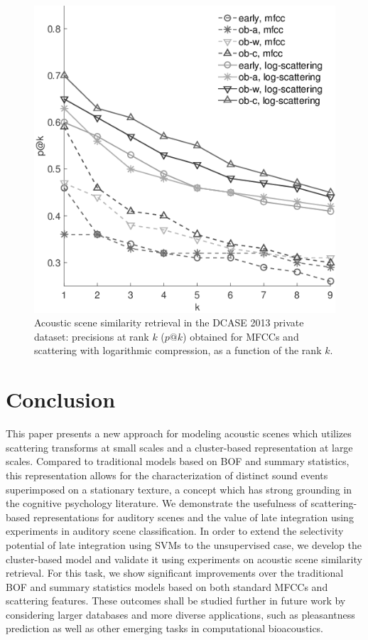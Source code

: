 \documentclass[journal]{IEEEtran}
\begin{document}
\begin{figure}[t]
\begin{center}
\includegraphics[width=.9\columnwidth]{bw/unsupervised_test2}
\caption{Acoustic scene similarity retrieval in the DCASE 2013 private dataset: precisions at rank $k$ ($p@k$) obtained for MFCCs and scattering with logarithmic compression, as a function of the rank $k$.}
\label{fig:ASS_1}
\end{center}
\end{figure}

\section{Conclusion}

This paper presents a new approach for modeling acoustic scenes which utilizes scattering transforms at small scales and a cluster-based representation at large scales. Compared to traditional models based on BOF and summary statistics, this representation allows for the characterization of distinct sound events superimposed on a stationary texture, a concept which has strong grounding in the cognitive psychology literature. We demonstrate the usefulness of scattering-based representations for auditory scenes and the value of late integration using experiments in auditory scene classification. In order to extend the selectivity potential of late integration using SVMs to the unsupervised case, we develop the cluster-based model and validate it using experiments on acoustic scene similarity retrieval. For this task, we show significant improvements over the traditional BOF and summary statistics models based on both standard MFCCs and scattering features.
These outcomes shall be studied further in future work by considering larger databases and more diverse applications, such as pleasantness prediction \cite{lafaySoundscapePilot} as well as other emerging tasks in computational bioacoustics.
\end{document}
